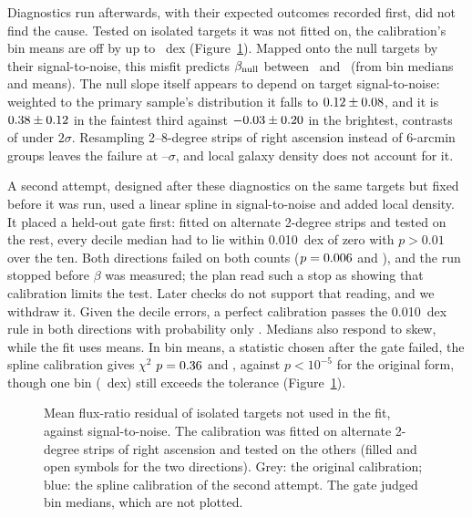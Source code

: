 \documentclass[twocolumn]{aastex631}
\begin{document}
Diagnostics run afterwards, with their expected outcomes recorded first, did not find the cause.
Tested on isolated targets it was not fitted on, the calibration's bin means are off by up to
\hbRealVoneMaxMean~dex (Figure~\ref{fig:heldout}). Mapped onto the null targets by their
signal-to-noise, this misfit predicts $\beta_{\rm null}$ between \hbRealMisfitNullMed\ and
\hbRealMisfitNull\ (from bin medians and means). The null slope itself appears to depend on target
signal-to-noise: weighted to the primary sample's distribution it falls to
$0.12\pm0.08$, and it is $0.38\pm0.12$ in the
faintest third against $-0.03\pm0.20$ in the brightest, contrasts of under
$2\sigma$.
Resampling 2--8-degree strips of right ascension instead of 6-arcmin groups leaves the failure at
\hbRealStripSigMin--\hbRealStripSigMax$\sigma$, and local galaxy density does not account for it.

A second attempt, designed after these diagnostics on the same targets but fixed before it was
run, used a linear spline in signal-to-noise and added local density. It placed a held-out gate
first: fitted on alternate 2-degree strips and tested on the rest, every decile median had to
lie within 0.010~dex of zero with $p>0.01$ over the ten. Both directions failed on both counts ($p=0.006$
and \hbRealVtwoPB), and the run stopped before $\beta$ was measured; the plan read such a stop as
showing that calibration limits the test. Later checks do not support that reading, and we
withdraw it. Given the decile errors, a perfect calibration passes the 0.010~dex rule in both
directions with probability only \hbRealAmpPass. Medians also respond to skew, while the fit
uses means. In bin means, a statistic chosen after the gate failed, the spline calibration
gives $\chi^2$ $p=0.36$ and \hbRealMeanPB, against $p<10^{-5}$ for the original form,
though one bin (\hbRealMeanMaxB~dex) still exceeds the tolerance (Figure~\ref{fig:heldout}).

\begin{figure}
\caption{Mean flux-ratio residual of isolated targets not used in the fit, against
signal-to-noise. The calibration was fitted on alternate 2-degree strips of right ascension and
tested on the others (filled and open symbols for the two directions). Grey: the original
calibration; blue: the spline calibration of the second attempt. The gate judged bin medians,
which are not plotted.}
\label{fig:heldout}
\end{figure}
\end{document}
